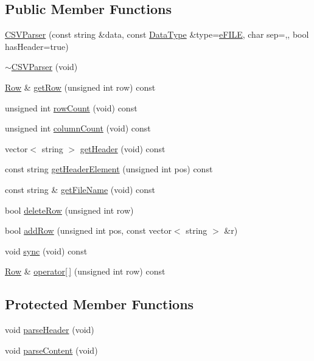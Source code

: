 \subsection*{Public Member Functions}
\begin{DoxyCompactItemize}
\item 
\hyperlink{class_c_s_v_parser_aba4d9ee88285f39766e7cc810f46d9d9}{C\+S\+V\+Parser} (const string \&data, const \hyperlink{_c_s_vparser_8hpp_ad8ed01ff3ff33333d8e19db4d2818bb6}{Data\+Type} \&type=\hyperlink{_c_s_vparser_8hpp_ad8ed01ff3ff33333d8e19db4d2818bb6a99e2aefa5a03705fd10b8b72e081349f}{e\+F\+I\+LE}, char sep=\textquotesingle{},\textquotesingle{}, bool has\+Header=true)
\item 
\hyperlink{class_c_s_v_parser_a43f06e2e24a260b80e83821c70f91f56}{$\sim$\+C\+S\+V\+Parser} (void)
\item 
\hyperlink{class_row}{Row} \& \hyperlink{class_c_s_v_parser_a93789f318f0abd972860c507b89d4587}{get\+Row} (unsigned int row) const
\item 
unsigned int \hyperlink{class_c_s_v_parser_ab7596d8458539a585908d41638672f4c}{row\+Count} (void) const
\item 
unsigned int \hyperlink{class_c_s_v_parser_a1e30268d574a0c1911de002a893d7a7e}{column\+Count} (void) const
\item 
vector$<$ string $>$ \hyperlink{class_c_s_v_parser_a95b7d4b188facfec7ebab65413f0130b}{get\+Header} (void) const
\item 
const string \hyperlink{class_c_s_v_parser_ad58dc7b467216ecb75f3bea681af3051}{get\+Header\+Element} (unsigned int pos) const
\item 
const string \& \hyperlink{class_c_s_v_parser_ad9a559d1c8de2a7d88a18170c9e11b80}{get\+File\+Name} (void) const
\item 
bool \hyperlink{class_c_s_v_parser_a1bc14d9edecb802c19ad25bd5cab23b3}{delete\+Row} (unsigned int row)
\item 
bool \hyperlink{class_c_s_v_parser_a7e742c5123efa0a49d576776f8832ddb}{add\+Row} (unsigned int pos, const vector$<$ string $>$ \&r)
\item 
void \hyperlink{class_c_s_v_parser_aa0b2494094eb2ce657787ae830b3cc52}{sync} (void) const
\item 
\hyperlink{class_row}{Row} \& \hyperlink{class_c_s_v_parser_a7d3d0c3f994b825aaba25625f0b01612}{operator\mbox{[}$\,$\mbox{]}} (unsigned int row) const
\end{DoxyCompactItemize}
\subsection*{Protected Member Functions}
\begin{DoxyCompactItemize}
\item 
void \hyperlink{class_c_s_v_parser_a8b556e47ecfea188d4c6c630616f5667}{parse\+Header} (void)
\item 
void \hyperlink{class_c_s_v_parser_aa403f7d8238903aa0e046a9a091ab968}{parse\+Content} (void)
\end{DoxyCompactItemize}
